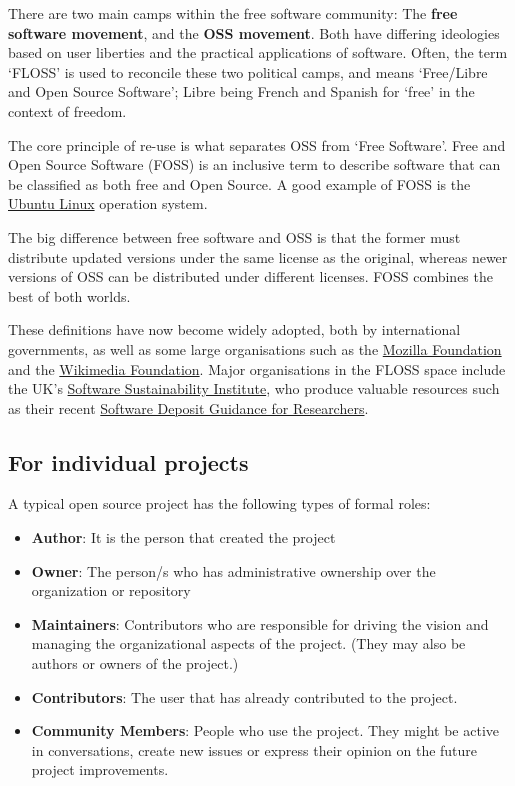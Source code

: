 \documentclass[]{book}
\providecommand{\tightlist}{%
  \setlength{\itemsep}{0pt}\setlength{\parskip}{0pt}}
\begin{document}
There are two main camps within the free software community: The \textbf{free software movement}, and the \textbf{OSS movement}. Both have differing ideologies based on user liberties and the practical applications of software. Often, the term `FLOSS' is used to reconcile these two political camps, and means `Free/Libre and Open Source Software'; Libre being French and Spanish for `free' in the context of freedom.

The core principle of re-use is what separates OSS from `Free Software'. Free and Open Source Software (FOSS) is an inclusive term to describe software that can be classified as both free and Open Source. A good example of FOSS is the \href{https://www.ubuntu.com/}{Ubuntu Linux} operation system.

The big difference between free software and OSS is that the former must distribute updated versions under the same license as the original, whereas newer versions of OSS can be distributed under different licenses. FOSS combines the best of both worlds.

These definitions have now become widely adopted, both by international governments, as well as some large organisations such as the \href{https://www.mozilla.org/en-US/foundation/}{Mozilla Foundation} and the \href{https://wikimediafoundation.org/wiki/Home}{Wikimedia Foundation}. Major organisations in the FLOSS space include the UK's \href{https://www.software.ac.uk/}{Software Sustainability Institute}, who produce valuable resources such as their recent \href{https://softwaresaved.github.io/software-deposit-guidance/}{Software Deposit Guidance for Researchers}.

\hypertarget{for-individual-projects}{%
\subsection{For individual projects}\label{for-individual-projects}}

A typical open source project has the following types of formal roles:

\begin{itemize}
\tightlist
\item
  \textbf{Author}: It is the person that created the project
\item
  \textbf{Owner}: The person/s who has administrative ownership over the organization or repository
\item
  \textbf{Maintainers}: Contributors who are responsible for driving the vision and managing the organizational aspects of the project. (They may also be authors or owners of the project.)
\item
  \textbf{Contributors}: The user that has already contributed to the project.
\item
  \textbf{Community Members}: People who use the project. They might be active in conversations, create new issues or express their opinion on the future project improvements.
\end{itemize}
\end{document}
